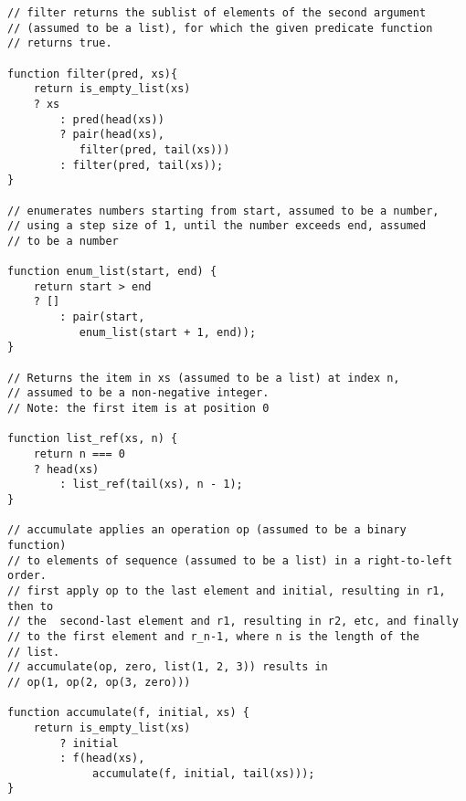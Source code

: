 \begin{lstlisting}
// filter returns the sublist of elements of the second argument
// (assumed to be a list), for which the given predicate function
// returns true.

function filter(pred, xs){
    return is_empty_list(xs)
	? xs
        : pred(head(xs))
	    ? pair(head(xs),
		   filter(pred, tail(xs)))
	    : filter(pred, tail(xs));
}

// enumerates numbers starting from start, assumed to be a number,
// using a step size of 1, until the number exceeds end, assumed
// to be a number

function enum_list(start, end) {
    return start > end
	? []
        : pair(start,
	       enum_list(start + 1, end));
}

// Returns the item in xs (assumed to be a list) at index n,
// assumed to be a non-negative integer.
// Note: the first item is at position 0

function list_ref(xs, n) {
    return n === 0
	? head(xs)
        : list_ref(tail(xs), n - 1);
}

// accumulate applies an operation op (assumed to be a binary function)
// to elements of sequence (assumed to be a list) in a right-to-left order.
// first apply op to the last element and initial, resulting in r1, then to
// the  second-last element and r1, resulting in r2, etc, and finally
// to the first element and r_n-1, where n is the length of the
// list.
// accumulate(op, zero, list(1, 2, 3)) results in
// op(1, op(2, op(3, zero)))

function accumulate(f, initial, xs) {
    return is_empty_list(xs)
        ? initial
        : f(head(xs),
             accumulate(f, initial, tail(xs)));
}
\end{lstlisting}


